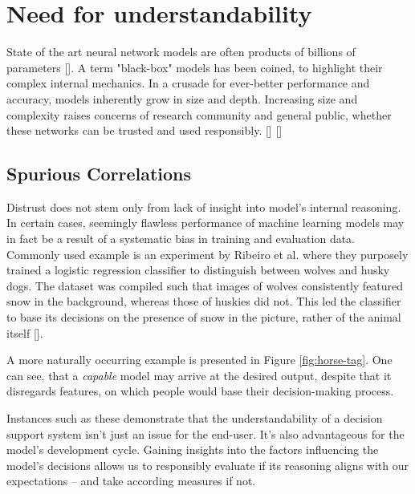 

\section{Need for understandability}

State of the art neural network models are often products of billions of parameters []. A term "black-box" models has been coined, to highlight their complex internal mechanics. In a crusade for ever-better performance and accuracy, models inherently grow in size and depth. Increasing size and complexity raises concerns of research community and general public, whether these networks can be trusted and used responsibly. [] []


\subsection*{Spurious Correlations}
Distrust does not stem only from lack of insight into model's internal reasoning. In certain cases, seemingly flawless performance of machine learning models may in fact be a result of a systematic bias in training and evaluation data. Commonly used example is an experiment by Ribeiro et al. where they purposely trained a logistic regression classifier to distinguish between wolves and husky dogs. The dataset was compiled such that images of wolves consistently featured snow in the background, whereas those of huskies did not. This led the classifier to base its decisions on the presence of snow in the picture, rather of the animal itself []. 


A more naturally occurring example is presented in Figure \ref{fig:horse-tag}. One can see, that a \emph{capable} model may arrive at the desired output, despite that it disregards features, on which people would base their decision-making process. 

Instances such as these demonstrate that the understandability of a decision support system isn't just an issue for the end-user. It's also advantageous for the model's development cycle. Gaining insights into the factors influencing the model's decisions allows us to responsibly evaluate if its reasoning aligns with our expectations -- and take according measures if not.


